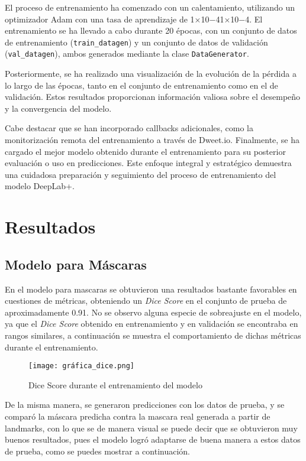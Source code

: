 \documentclass[runningheads]{llncs}
\begin{document}
El proceso de entrenamiento ha comenzado con un calentamiento, utilizando un optimizador Adam con una tasa de aprendizaje de 1×10−41×10−4. El entrenamiento se ha llevado a cabo durante 20 épocas, con un conjunto de datos de entrenamiento (\verb|train_datagen|) y un conjunto de datos de validación (\verb|val_datagen|), ambos generados mediante la clase \verb|DataGenerator|.

Posteriormente, se ha realizado una visualización de la evolución de la pérdida a lo largo de las épocas, tanto en el conjunto de entrenamiento como en el de validación. Estos resultados proporcionan información valiosa sobre el desempeño y la convergencia del modelo.

Cabe destacar que se han incorporado callbacks adicionales, como la monitorización remota del entrenamiento a través de Dweet.io. Finalmente, se ha cargado el mejor modelo obtenido durante el entrenamiento para su posterior evaluación o uso en predicciones. Este enfoque integral y estratégico demuestra una cuidadosa preparación y seguimiento del proceso de entrenamiento del modelo DeepLab+.


\section{Resultados}

\subsection{Modelo para Máscaras}

En el modelo para mascaras se obtuvieron una resultados bastante favorables en cuestiones de métricas, obteniendo un \textit{Dice Score} en el conjunto de prueba de aproximadamente 0.91. No se observo alguna especie de sobreajuste en el modelo, ya que el \textit{Dice Score} obtenido en entrenamiento y en validación se encontraba en rangos similares, a continuación se muestra el comportamiento de dichas métricas durante el entrenamiento.


\begin{figure} [H]
    \centering
    \texttt{[image: gráfica\_dice.png]}
    \caption{Dice Score durante el entrenamiento del modelo}
    \label{fig:fig8}
\end{figure}

De la misma manera, se generaron predicciones con los datos de prueba, y se comparó la máscara predicha contra la mascara real generada a partir de landmarks, con lo que se de manera visual se puede decir que se obtuvieron muy buenos resultados, pues el modelo logró adaptarse de buena manera a estos datos de prueba, como se puedes mostrar a continuación.
\end{document}
